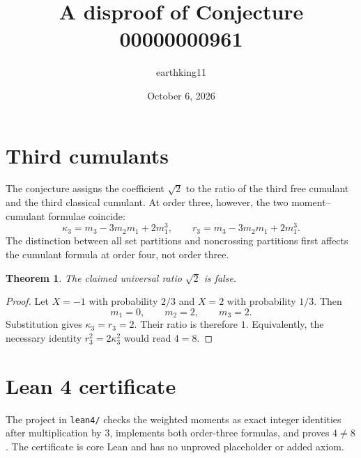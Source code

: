 \documentclass[11pt]{article}
\title{A disproof of Conjecture 00000000961}
\author{earthking11}
\date{October 6, 2026}
\newtheorem{theorem}{Theorem}
\begin{document}
\maketitle
\section*{Third cumulants}
The conjecture assigns the coefficient $\sqrt2$ to the ratio of the third
free cumulant and the third classical cumulant.  At order three, however, the
two moment--cumulant formulae coincide:
\[
 \kappa_3=m_3-3m_2m_1+2m_1^3,
 \qquad
 r_3=m_3-3m_2m_1+2m_1^3.
\]
The distinction between all set partitions and noncrossing partitions first
affects the cumulant formula at order four, not order three.

\begin{theorem}
The claimed universal ratio $\sqrt2$ is false.
\end{theorem}
\begin{proof}
Let $X=-1$ with probability $2/3$ and $X=2$ with probability $1/3$.  Then
\[
 m_1=0,\qquad m_2=2,\qquad m_3=2.
\]
Substitution gives $\kappa_3=r_3=2$.  Their ratio is therefore $1$.  Equivalently,
the necessary identity $r_3^2=2\kappa_3^2$ would read $4=8$.
\end{proof}

\section*{Lean 4 certificate}
The project in \texttt{lean4/} checks the weighted moments as exact integer
identities after multiplication by $3$, implements both order-three formulas,
and proves $4\ne8$.  The certificate is core Lean and has no unproved
placeholder or added axiom.
\end{document}
